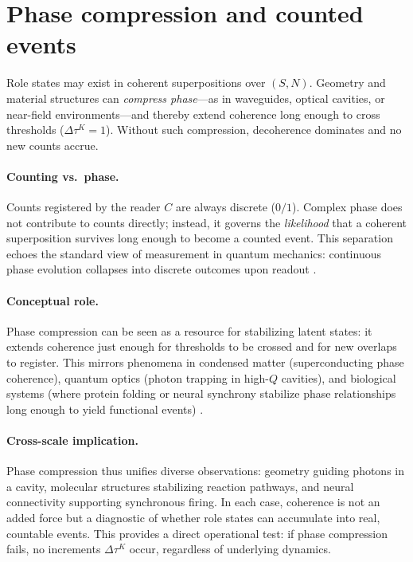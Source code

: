 \documentclass[12pt,a4paper,oneside]{scrreprt}
\begin{document}
\section{Phase compression and counted events}\label{sec:quanta-phase}

Role states may exist in coherent superpositions over $(S,N)$. 
Geometry and material structures can \emph{compress phase}---as in waveguides, 
optical cavities, or near-field environments---and thereby extend coherence 
long enough to cross thresholds ($\Delta \tau^K = 1$). 
Without such compression, decoherence dominates and no new counts accrue. 

\paragraph{Counting vs.\ phase.} 
Counts registered by the reader $C$ are always discrete ($0/1$). 
Complex phase does not contribute to counts directly; instead, it governs the 
\emph{likelihood} that a coherent superposition survives long enough to 
become a counted event. 
This separation echoes the standard view of measurement in quantum mechanics: 
continuous phase evolution collapses into discrete outcomes upon readout 
\citep{Zurek2003Decoherence}. 

\paragraph{Conceptual role.} 
Phase compression can be seen as a resource for stabilizing latent states: 
it extends coherence just enough for thresholds to be crossed and for new 
overlaps to register. 
This mirrors phenomena in condensed matter (superconducting phase coherence), 
quantum optics (photon trapping in high-$Q$ cavities), and biological systems 
(where protein folding or neural synchrony stabilize phase relationships 
long enough to yield functional events) \citep{Tegmark2000Importance,Friston2010FEP}. 

\paragraph{Cross-scale implication.} 
Phase compression thus unifies diverse observations: 
geometry guiding photons in a cavity, 
molecular structures stabilizing reaction pathways, 
and neural connectivity supporting synchronous firing. 
In each case, coherence is not an added force but a diagnostic of whether 
role states can accumulate into real, countable events. 
This provides a direct operational test: if phase compression fails, 
no increments $\Delta \tau^K$ occur, regardless of underlying dynamics.
\end{document}
